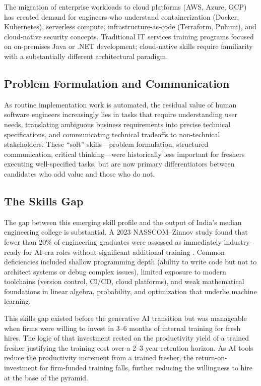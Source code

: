 \documentclass[conference]{IEEEtran}
\begin{document}
The migration of enterprise workloads to cloud platforms (AWS, Azure, GCP) has created demand for engineers who understand containerization (Docker, Kubernetes), serverless compute, infrastructure-as-code (Terraform, Pulumi), and cloud-native security concepts. Traditional IT services training programs focused on on-premises Java or .NET development; cloud-native skills require familiarity with a substantially different architectural paradigm.

\subsection{Problem Formulation and Communication}

As routine implementation work is automated, the residual value of human software engineers increasingly lies in tasks that require understanding user needs, translating ambiguous business requirements into precise technical specifications, and communicating technical tradeoffs to non-technical stakeholders. These ``soft'' skills---problem formulation, structured communication, critical thinking---were historically less important for freshers executing well-specified tasks, but are now primary differentiators between candidates who add value and those who do not.

\subsection{The Skills Gap}

The gap between this emerging skill profile and the output of India's median engineering college is substantial. A 2023 NASSCOM--Zinnov study found that fewer than 20\% of engineering graduates were assessed as immediately industry-ready for AI-era roles without significant additional training \cite{nasscom2023skills}. Common deficiencies included shallow programming depth (ability to write code but not to architect systems or debug complex issues), limited exposure to modern toolchains (version control, CI/CD, cloud platforms), and weak mathematical foundations in linear algebra, probability, and optimization that underlie machine learning.

This skills gap existed before the generative AI transition but was manageable when firms were willing to invest in 3--6 months of internal training for fresh hires. The logic of that investment rested on the productivity yield of a trained fresher justifying the training cost over a 2--3 year retention horizon. As AI tools reduce the productivity increment from a trained fresher, the return-on-investment for firm-funded training falls, further reducing the willingness to hire at the base of the pyramid.
\end{document}
